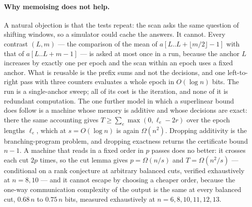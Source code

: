 \documentclass[11pt]{article}
\begin{document}
\paragraph{Why memoising does not help.} A natural objection is that the tests repeat: the scan asks
the same question of shifting windows, so a simulator could cache the answers. It cannot. Every
contrast $(L,m)$ --- the comparison of the mean of $a[L..L+\lfloor m/2\rfloor-1]$ with that of
$a[L..L+m-1]$ --- is asked at most once in a run, because the anchor $L$ increases by exactly one per
epoch and the scan within an epoch uses a fixed anchor. What is reusable is the prefix sums and not
the decisions, and one left-to-right pass with three counters evaluates a whole epoch in
$O(\log n)$ bits. The run is a single-anchor sweep; all of its cost is the iteration, and none of it
is redundant computation. The one further model in which a superlinear bound does follow is a machine
whose memory is additive and whose decisions are exact: there the same accounting gives
$T\ge\sum_e\max(0,\ell_e-2r)$ over the epoch lengths $\ell_e$, which at $s=O(\log n)$ is again
$\Omega(n^2)$. Dropping additivity is the branching-program problem, and dropping exactness returns
the certificate bound $n-1$. A machine that reads in a fixed order in $p$ passes does no better: it
crosses each cut $2p$ times, so the cut lemma gives $p=\Omega(n/s)$ and $T=\Omega(n^2/s)$ ---
conditional on a rank conjecture at arbitrary balanced cuts, verified exhaustively at $n=8,10$ --- and
it cannot escape by choosing a cheaper order, because the one-way communication complexity of the
output is the same at every balanced cut, $0.68\,n$ to $0.75\,n$ bits, measured exhaustively at
$n=6,8,10,11,12,13$.
\end{document}
